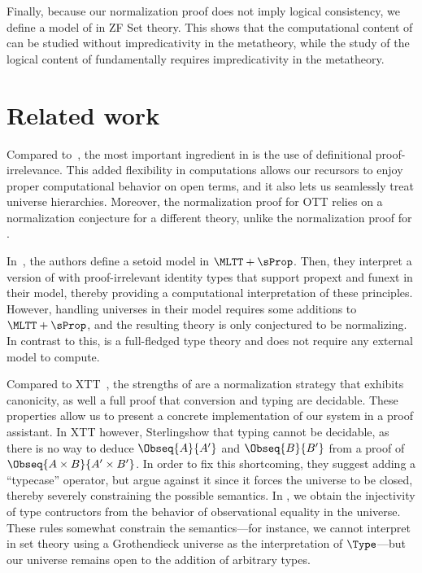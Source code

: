 Finally, because our normalization proof does not imply logical
consistency, we define a model of \SetoidCC in ZF Set
theory.
%
This shows that the computational content of \SetoidCC can be studied
without impredicativity in the metatheory, while the study of the
logical content of \SetoidCC fundamentally requires impredicativity in
the metatheory. 


\section{Related work}

Compared to~, the most important ingredient in \SetoidTT is the
use of definitional proof-irrelevance.
%
This added flexibility in computations allows our recursors to enjoy proper computational
behavior on open terms, and it also lets us seamlessly treat universe hierarchies.
%
Moreover, the normalization proof for OTT relies on a normalization conjecture for a different
theory, unlike the normalization proof for \SetoidTT.

In~, the authors define a setoid model in \( \MLTT+\sProp \). Then, they
interpret a version of \MLTT with proof-irrelevant identity types that support propext and
funext in their model, thereby providing a computational interpretation of these principles.
%
However, handling universes in their model requires some additions to \( \MLTT+\sProp \), and
the resulting theory is only conjectured to be normalizing.
%
In contrast to this, \SetoidTT is a full-fledged type theory and does not require any external
model to compute.

Compared to XTT~, the strengths of \SetoidTT are a
normalization strategy that exhibits canonicity, as well a full proof that conversion and typing
are decidable. These properties allow us to present a concrete implementation of our system
in a proof assistant.
%
In XTT however, Sterling\etal show that typing cannot be decidable, as there is no way to deduce
\( \Obseq{A}{A'} \) and \( \Obseq{B}{B'} \) from a proof of \( \Obseq{A \times B}{A' \times B'} \).
%
In order to fix this shortcoming, they suggest adding a ``typecase'' operator, but
argue against it since it forces the universe to be closed, thereby severely constraining the
possible semantics.
%
In \SetoidTT, we obtain the injectivity of type contructors from the behavior of observational
equality in the universe. These rules somewhat constrain the semantics---for instance, we cannot
interpret \SetoidTT in set theory using a Grothendieck universe as the interpretation of \( \Type \)---but our universe remains open to the addition of arbitrary types.

